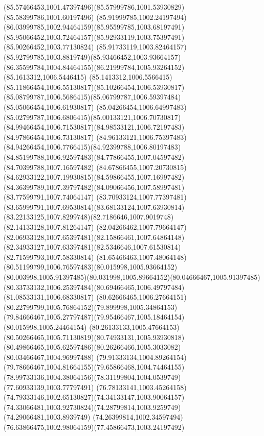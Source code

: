 {{	\curveto(85.57466453,1001.47397496)(85.57999786,1001.53930829)(85.58399786,1001.60197496)
	\curveto(85.91999785,1002.24197494)(86.03999785,1002.94464159)(85.95599785,1003.68197491)
	\curveto(85.95066452,1003.72464157)(85.92933119,1003.75397491)(85.90266452,1003.77130824)
	\curveto(85.91733119,1003.82464157)(85.92799785,1003.8819749)(85.93466452,1003.93664157)
	\curveto(86.35599784,1004.84464155)(86.21999784,1005.93264152)(85.1613312,1006.5446415)
	\curveto(85.1413312,1006.5566415)(85.11866454,1006.55130817)(85.10266454,1006.53930817)
	\curveto(85.08799787,1006.5686415)(85.06799787,1006.59397484)(85.05066454,1006.61930817)
	\curveto(85.04266454,1006.64997483)(85.02799787,1006.6806415)(85.00133121,1006.70730817)
	\curveto(84.99466454,1006.71530817)(84.98533121,1006.72197483)(84.97866454,1006.73130817)
	\curveto(84.96133121,1006.75397483)(84.94266454,1006.7766415)(84.92399788,1006.80197483)
	\curveto(84.85199788,1006.92597483)(84.77866455,1007.04597482)(84.70399788,1007.16597482)
	\curveto(84.67866455,1007.20730815)(84.62933122,1007.19930815)(84.59866455,1007.16997482)
	\curveto(84.36399789,1007.39797482)(84.09066456,1007.58997481)(83.77599791,1007.74064147)
	\curveto(83.70933124,1007.77397481)(83.65999791,1007.69530814)(83.68133124,1007.63930814)
	\curveto(83.22133125,1007.8299748)(82.7186646,1007.9019748)(82.14133128,1007.81264147)
	\curveto(82.04266462,1007.79664147)(82.06933128,1007.65397481)(82.15866461,1007.64864148)
	\curveto(82.34933127,1007.63397481)(82.5346646,1007.61530814)(82.71599793,1007.58330814)
	\curveto(81.65466463,1007.48064148)(80.51199799,1006.76597483)(80.015998,1005.93664152)
	\curveto(80.003998,1005.91397485)(80.031998,1005.89664152)(80.04666467,1005.91397485)
	\curveto(80.33733132,1006.25397484)(80.69466465,1006.49797484)(81.08533131,1006.68330817)
	\curveto(80.62666465,1006.27664151)(80.22799799,1005.76864152)(79.899998,1005.34864153)
	\curveto(79.84666467,1005.27797487)(79.95466467,1005.18464154)(80.015998,1005.24464154)
	\curveto(80.26133133,1005.47664153)(80.50266465,1005.71130819)(80.74933131,1005.93930818)
	\curveto(80.49866465,1005.62597486)(80.26266466,1005.3033082)(80.03466467,1004.96997488)
	\curveto(79.91333134,1004.89264154)(79.78666467,1004.81664155)(79.65866468,1004.74464155)
	\curveto(78.99733136,1004.38064156)(78.31199804,1004.0539749)(77.60933139,1003.77797491)
	\curveto(76.78133141,1003.45264158)(74.79333146,1002.65130827)(74.34133147,1003.90064157)
	\curveto(74.33066481,1003.92730824)(74.28799814,1003.9259749)(74.29066481,1003.8939749)
	\curveto(74.26399814,1002.34597494)(76.63866475,1002.98064159)(77.45866473,1003.24197492)
}}
